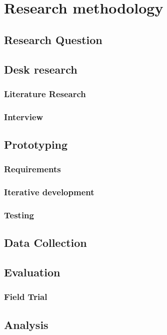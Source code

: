 \documentclass[../Main/thesis.tex]{subfiles}
\begin{document}
\chapter{Research methodology}
\label{ch:research_methodology}

\section{Research Question}

\section{Desk research}
\subsection{Literature Research}
\subsection{Interview}

\section{Prototyping}
\subsection{Requirements}
\subsection{Iterative development}
\subsection{Testing}

\section{Data Collection}


\section{Evaluation}
\subsection{Field Trial}
\section{Analysis}
\end{document}
